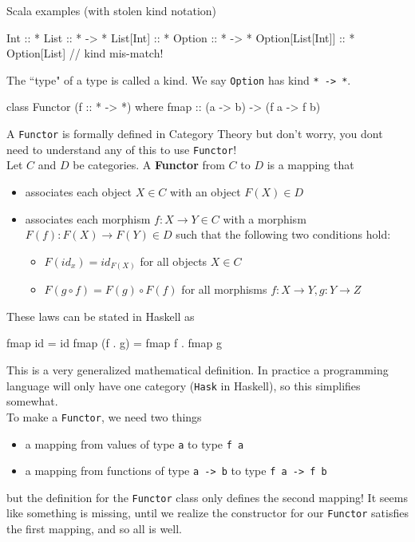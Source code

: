 \documentclass[12pt]{article}
\begin{document}
Scala examples (with stolen kind notation)
\begin{scala}
Int       :: *
List      :: * -> *
List[Int] :: *
Option    :: * -> *
Option[List[Int]] :: *
Option[List] // kind mis-match!
\end{scala}

The ``type" of a type is called a kind. We say \texttt{Option} has kind \texttt{* -> *}.
\newpage

\begin{haskell}
class Functor (f :: * -> *) where
    fmap :: (a -> b) -> (f a -> f b)
\end{haskell}

A \texttt{Functor} is formally defined in Category Theory but don't worry, you dont need
to understand any of this to use \texttt{Functor}!\\
Let $C$ and $D$ be categories. A \textbf{Functor} from $C$ to $D$ is a mapping that
\begin{itemize}
    \item{associates each object ${X \in C}$ with an object ${F(X) \in D}$}
    \item{associates each morphism ${f : X \rightarrow Y \in C}$ with a morphism ${F(f) : F(X) \rightarrow F(Y) \in D}$ such that the following two conditions hold:
            \begin{itemize}
                \item{${F(id_x) = id_{F(X)}}$ for all objects ${X \in C}$}
                \item{${F(g \circ f) = F(g) \circ F(f)}$ for all morphisms ${f : X \rightarrow Y, g : Y \rightarrow Z}$}
        \end{itemize}}
\end{itemize}

These laws can be stated in Haskell as
\begin{haskell}
    fmap id = id
    fmap (f . g) = fmap f . fmap g
\end{haskell}

This is a very generalized mathematical definition. In practice a programming
language will only have one category (\texttt{Hask} in Haskell), so this
simplifies somewhat. \\

To make a \texttt{Functor}, we need two things
\begin{itemize}
    \item{a mapping from values of type \texttt{a} to type \texttt{f a}}
    \item{a mapping from functions of type \texttt{a -> b} to type \texttt{f a -> f b}}
\end{itemize}
but the definition for the \texttt{Functor} class only defines the second mapping!
It seems like something is missing, until we realize the constructor for our \texttt{Functor}
satisfies the first mapping, and so all is well.
\newpage
\end{document}
